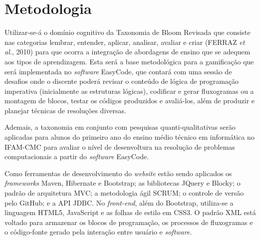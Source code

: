 \documentclass[12pt]{article}
\begin{document}
\section{Metodologia} 
Utilizar-se-á o domínio cognitivo da Taxonomia de Bloom Revisada que consiste nas categorias lembrar, entender, aplicar, analisar, avaliar e criar (FERRAZ \textit{et al.}, 2010) para que ocorra a integração de abordagens de ensino que se adequem aos tipos de aprendizagem. Esta será a base metodológica para a gamificação que será implementada no \textit{software} EasyCode, que contará com uma sessão de desafios onde o discente poderá revisar o conteúdo de lógica de programação imperativa (inicialmente as estruturas lógicas), codificar e gerar fluxogramas ou a montagem de blocos, testar os códigos produzidos e avaliá-los, além de produzir e planejar técnicas de resoluções diversas.
\par Ademais, a taxonomia em conjunto com pesquisas quanti-qualitativas serão aplicadas para alunos do primeiro ano do ensino médio técnico em informática no IFAM-CMC para avaliar o nível de desenvoltura na resolução de problemas computacionais a partir do \textit{software} EasyCode.
\par Como ferramentas de desenvolvimento do \textit{website} estão sendo aplicados os \textit{frameworks} Maven, Hibernate e Bootstrap; as bibliotecas JQuery e Blocky; o padrão de arquitetura MVC; a metodologia ágil SCRUM; o controle de versão pelo GitHub; e a API JDBC. No \textit{front-end}, além do Bootstrap, utiliza-se a linguagem HTML5, JavaScript e as folhas de estilo em CSS3. O padrão XML está voltado para armazenar os blocos de programação, os processos de fluxogramas e o código-fonte gerado pela interação entre usuário e \textit{software}. 
\end{document}
